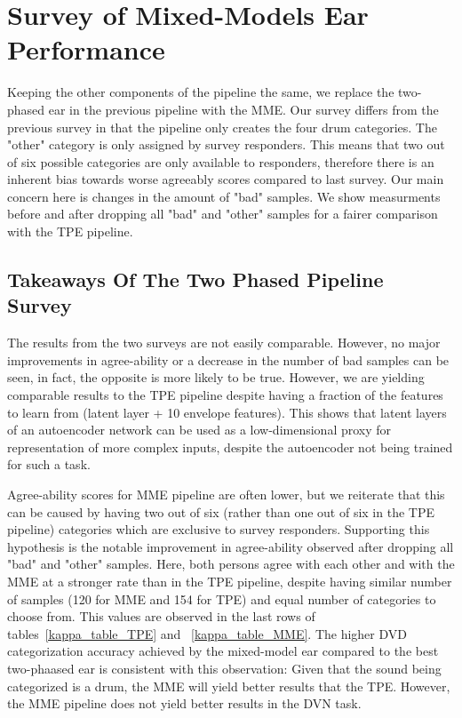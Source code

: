 \documentclass[\main/thesis.tex]{subfiles}
\begin{document}
 \section{Survey of Mixed-Models Ear Performance}
 Keeping the other components of the pipeline the same, we replace the two-phased ear in the previous pipeline with the MME. Our survey differs from the previous survey in that the pipeline only creates the four drum categories. The "other" category is only assigned by survey responders. This means that two out of six possible categories are only available to responders, therefore there is an inherent bias towards worse agreeably scores compared to last survey. Our main concern here is changes in the amount of "bad" samples. We show measurments before and after dropping all "bad" and "other" samples for a fairer comparison with the TPE pipeline.
 
 \subsection{Takeaways Of The Two Phased Pipeline Survey}
\label{survey1_takeaway}
The results from the two surveys are not easily comparable. However, no major improvements in agree-ability or a decrease in the number of bad samples can be seen, in fact, the opposite is more likely to be true. However, we are yielding comparable results to the TPE pipeline despite having a fraction of the features to learn from (latent layer + 10 envelope features). This shows that latent layers of an autoencoder network can be used as a low-dimensional proxy for representation of more complex inputs, despite the autoencoder not being trained for such a task. 

Agree-ability scores for MME pipeline are often lower, but we reiterate that this can be caused by having two out of six (rather than one out of six in the TPE pipeline) categories which are exclusive to survey responders. Supporting this hypothesis is the notable improvement in agree-ability observed after dropping all "bad" and "other" samples. Here, both persons agree with each other and with the MME at a stronger rate than in the TPE pipeline, despite having similar number of samples (120 for MME and 154 for TPE) and equal number of categories to choose from. This values are observed in the last rows of tables~\ref{kappa_table_TPE} and ~\ref{kappa_table_MME}. The higher DVD categorization accuracy achieved by the mixed-model ear compared to the best two-phaased ear is consistent with this observation: Given that the sound being categorized is a drum, the MME will yield better results that the TPE. However, the MME pipeline does not yield better results in the DVN task. 
\end{document}
